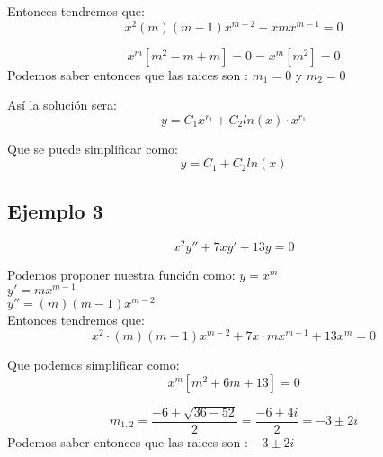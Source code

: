 \documentclass[12pt]{report}                               %
\begin{document}
        Entonces tendremos que:
        \begin{equation*}
            x^2 (m)(m-1)x^{m-2} + x mx^{m-1} = 0
        \end{equation*}

        \begin{equation*}
            x^m [m^2 - m + m] = 0 = x^m [m^2] = 0
        \end{equation*}
        Podemos saber entonces que las raices son : $ m_1 = 0$ y $m_2 = 0$

        Así la solución sera:
        \begin{equation*}
            y = C_1 x ^{r_1} + C_2 ln(x) \cdot x^{r_1}
        \end{equation*}

        Que se puede simplificar como:
        \begin{equation*}
            y = C_1 + C_2 ln(x)
        \end{equation*}

        \subsection{Ejemplo 3}
        \begin{equation*}
            x^2 y'' + 7 x y' + 13y = 0
        \end{equation*}

        Podemos proponer nuestra función como:
        $y = x^m$\\
        $y' = mx^{m-1}$\\
        $y'' = (m)(m-1)x^{m-2}$\\

        Entonces tendremos que:
        \begin{equation*}
            x^2 \cdot (m)(m-1)x^{m-2} + 7x \cdot mx^{m-1} + 13 x^m= 0
        \end{equation*}

        Que podemos simplificar como:
        \begin{equation*}
            x^m [m^2 + 6m + 13] = 0
        \end{equation*}

        \begin{equation*}
            m_{1,2} = \frac{-6 \pm \sqrt{36-52}}{2} = \frac{-6 \pm 4i}{2} = -3 \pm 2i
        \end{equation*}
        Podemos saber entonces que las raices son : $ -3 \pm 2i$
\end{document}
